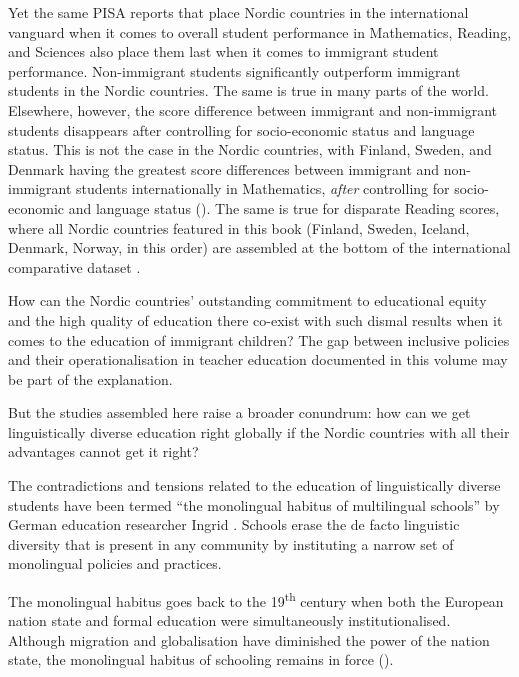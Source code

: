 \documentclass[output=paper]{langscibook}
\begin{document}
Yet the same PISA reports that place Nordic countries in the international vanguard when it comes to overall student performance in Mathematics, Reading, and Sciences also place them last when it comes to immigrant student performance. Non-immigrant students significantly outperform immigrant students in the Nordic countries. The same is true in many parts of the world. Elsewhere, however, the score difference between immigrant and non-immigrant students disappears after controlling for socio-economic status and language status. This is not the case in the Nordic countries, with Finland, Sweden, and Denmark having the greatest score differences between immigrant and non-immigrant students internationally in Mathematics, \textit{after} controlling for socio-economic and language status (\citealt[217]{OECD2023}). The same is true for disparate Reading scores, where all Nordic countries featured in this book (Finland, Sweden, Iceland, Denmark, Norway, in this order) are assembled at the bottom of the international comparative dataset \citep[218]{OECD2023}.

How can the Nordic countries’ outstanding commitment to educational equity and the high quality of education there co-exist with such dismal results when it comes to the education of immigrant children? The gap between inclusive policies and their operationalisation in teacher education documented in this volume may be part of the explanation. 

But the studies assembled here raise a broader conundrum: how can we get linguistically diverse education right globally if the Nordic countries with all their advantages cannot get it right?

\begin{sloppypar}
The contradictions and tensions related to the education of linguistically diverse students have been termed “the monolingual habitus of multilingual schools” by German education researcher Ingrid \citet{Gogolin1994,Gogolin1997}. Schools erase the de facto linguistic diversity that is present in any community by instituting a narrow set of monolingual policies and practices. 
\end{sloppypar}

The monolingual habitus goes back to the 19\textsuperscript{th} century when both the European nation state and formal education were simultaneously institutionalised. Although migration and globalisation have diminished the power of the nation state, the monolingual habitus of schooling remains in force (\citealt{PillerEtAl2024}). 
\end{document}
